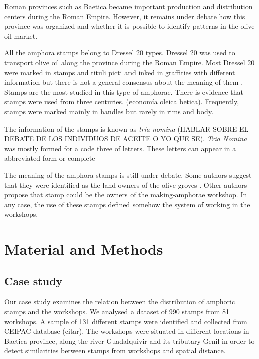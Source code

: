\documentclass[review]{elsarticle}
\begin{document}
 


Roman provinces such as Baetica became important production and distribution centers during the Roman Empire. However, it remains under debate how this province was organized and whether it is possible to identify patterns in the olive oil market. 

 




All the amphora stamps belong to Dressel 20 types. Dressel 20 was used to transport olive oil along the province during the Roman Empire. Most Dressel 20 were marked in stamps and tituli picti and inked in graffities with different information but there is not a general consensus about the meaning of them \citep{rodriguez_baetican_1998}. Stamps are the most studied in this type of amphorae. There is evidence that stamps were used from three centuries. (economía oleica betica). Frequently, stamps were marked mainly in handles but rarely in rims and body. 

The information of the stamps is known as \textit{tria nomina} (HABLAR SOBRE EL DEBATE DE LOS INDIVIDUOS DE ACEITE O YO QUE SE). \textit{Tria Nomina} was mostly formed for a code three of letters. These letters can appear in a abbreviated form or complete \citep{berni_millet_amphora_1996}

The meaning of the amphora stamps is still under debate. Some authors suggest that they were identified as the land-owners of the olive groves \citep{rodriguez_economioleicola_1977}. Other authors propose that stamp could be the owners of the making-amphorae workshop. In any case, the use of these stamps defined somehow the system of working in the workshops. 

\section{Material and Methods}

\subsection{Case study}

Our case study examines the relation between the distribution of amphoric stamps and the workshops. We analysed a dataset of 990 stamps from 81 workshops. A sample of 131 different stamps were identified and collected from CEIPAC database (citar). The workshops were situated in different locations in Baetica province, along the river Guadalquivir and its tributary Genil in order to detect similarities between stamps from workshops and spatial distance. 
\end{document}
